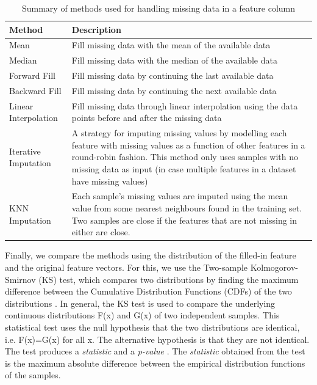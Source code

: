 \begin{table}[h] 
 \caption{Summary of methods used for handling missing data in a feature column}
 \begin{tabular*}{\textwidth}{PL}
 \toprule
 \textbf{Method} & \textbf{Description}\\
 \midrule
 Mean & Fill missing data with the mean of the available data \\
 Median & Fill missing data with the median of the available data\\
 Forward Fill & Fill missing data by continuing the last available data\\
 Backward Fill & Fill missing data by continuing the next available data\\
 Linear Interpolation & Fill missing data through linear interpolation using the data points before and after the missing data\\
 Iterative Imputation \cite{buuren_mice_2011} & A strategy for imputing missing values by modelling each feature with missing values as a function of other features in a round-robin fashion. This method only uses samples with no missing data as input (in case multiple features in a dataset have missing values) \\
 KNN Imputation \cite{troyanskaya_missing_2001} & Each sample's missing values are imputed using the mean value from some nearest neighbours found in the training set. Two samples are close if the features that are not missing in either are close.\\
 \bottomrule
 \end{tabular*}
 \label{tab:missing_data_methods}
\end{table}


Finally, we compare the methods using the distribution of the filled-in feature and the original feature vectors. For this, we use the Two-sample Kolmogorov-Smirnov (KS) test, which compares two distributions by finding the maximum difference between the Cumulative Distribution Functions (CDFs) of the two distributions \cite{hodges_significance_1958}. In general, the KS test is used to compare the underlying continuous distributions F(x) and G(x) of two independent samples. This statistical test uses the null hypothesis that the two distributions are identical, i.e. F(x)=G(x) for all x. The alternative hypothesis is that they are not identical. The test produces a \emph{statistic} and a \emph{p-value} \cite{bruce_statistical_2017}. The \emph{statistic} obtained from the test is the maximum absolute difference between the empirical distribution functions of the samples. 


